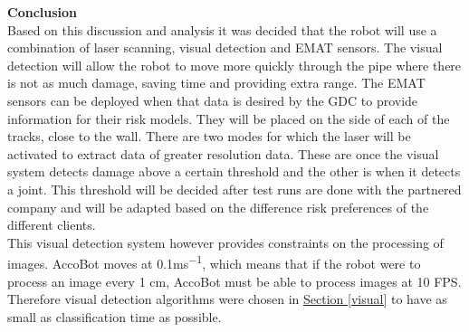 \documentclass[11pt]{article}		%
\newcommand{\supercite}[1]{\textsuperscript{\cite{#1}}}		%
\newcommand{\sectref}[1]{\hyperref[#1]{Section \ref*{#1}}}     %
\begin{document}
	        \textbf{Conclusion}
	        \\
            Based on this discussion and analysis it was decided that the robot will use a combination of laser scanning, visual detection and EMAT sensors. The visual detection will allow the robot to move more quickly through the pipe where there is not as much damage, saving time and providing extra range. The EMAT sensors can be deployed when that data is desired by the GDC to provide information for their risk models. They will be placed on the side of each of the tracks, close to the wall. There are two modes for which the laser will be activated to extract data of greater resolution data. These are once the visual system detects damage above a certain threshold and the other is when it detects a joint. This threshold will be decided after test runs are done with the partnered company and will be adapted based on the difference risk preferences of the different clients.
            \\
            \hspace*{2ex}This visual detection system however provides constraints on the processing of images. AccoBot moves at 0.1ms\textsuperscript{−1}, which means that if the robot were to process an image every 1 cm, AccoBot must be able to process images at 10 FPS. Therefore visual detection algorithms were chosen in \sectref{visual} to have as small as classification time as possible.
	        
	        
\end{document}
